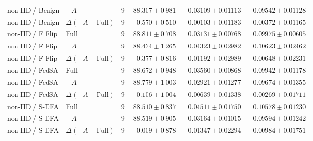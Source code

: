 \begin{table}[t]
\begin{tabular}{llrrrr}
non-IID / Benign & $-A$ & 9 & $88.307 \pm 0.981$ & $0.03109 \pm 0.01113$ & $0.09542 \pm 0.01128$ \\
non-IID / Benign & $\Delta(-A-\mathrm{Full})$ & 9 & $-0.570 \pm 0.510$ & $0.00103 \pm 0.01183$ & $-0.00372 \pm 0.01165$ \\
non-IID / F Flip & Full & 9 & $88.811 \pm 0.708$ & $0.03131 \pm 0.00768$ & $0.09975 \pm 0.00605$ \\
non-IID / F Flip & $-A$ & 9 & $88.434 \pm 1.265$ & $0.04323 \pm 0.02982$ & $0.10623 \pm 0.02462$ \\
non-IID / F Flip & $\Delta(-A-\mathrm{Full})$ & 9 & $-0.377 \pm 0.816$ & $0.01192 \pm 0.02989$ & $0.00648 \pm 0.02231$ \\
non-IID / FedSA & Full & 9 & $88.672 \pm 0.948$ & $0.03560 \pm 0.00868$ & $0.09942 \pm 0.01178$ \\
non-IID / FedSA & $-A$ & 9 & $88.779 \pm 1.003$ & $0.02921 \pm 0.01277$ & $0.09674 \pm 0.01355$ \\
non-IID / FedSA & $\Delta(-A-\mathrm{Full})$ & 9 & $0.106 \pm 1.004$ & $-0.00639 \pm 0.01338$ & $-0.00269 \pm 0.01711$ \\
non-IID / S-DFA & Full & 9 & $88.510 \pm 0.837$ & $0.04511 \pm 0.01750$ & $0.10578 \pm 0.01230$ \\
non-IID / S-DFA & $-A$ & 9 & $88.519 \pm 0.905$ & $0.03164 \pm 0.01015$ & $0.09594 \pm 0.01242$ \\
non-IID / S-DFA & $\Delta(-A-\mathrm{Full})$ & 9 & $0.009 \pm 0.878$ & $-0.01347 \pm 0.02294$ & $-0.00984 \pm 0.01751$ \\
\bottomrule
\end{tabular}
\end{table}

